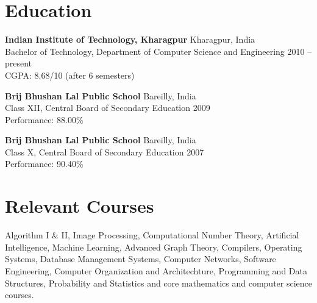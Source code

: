 \documentclass[hidelinks,margin,line,10pt,a4paper]{resume}
\begin{document}
\begin{resume}

\section{\mysidestyle Education}
\begin{list2}

            \item \textbf{Indian Institute of Technology, Kharagpur} \hfill Kharagpur, India \vspace{0mm}\\\vspace{1mm}%
    		Bachelor of Technology, Department of Computer Science and Engineering \hfill 2010 -- present  \vspace{-1mm}\\\vspace{1mm}%
		CGPA: 8.68/10 {(after 6 semesters)}
		 
             \item \textbf{Brij Bhushan Lal Public School} \hfill Bareilly, India \vspace{0mm}\\\vspace{1mm}%
    		{Class XII, Central Board of Secondary Education } \hfill { 2009}  \vspace{-1mm}\\\vspace{1mm}%
		{Performance: 88.00\%}
		
			\item \textbf{Brij Bhushan Lal Public School} \hfill Bareilly, India \vspace{0mm}\\\vspace{1mm}%
    		{Class X, Central Board of Secondary Education } \hfill { 2007 }  \vspace{-1mm}\\\vspace{1mm}%
		{Performance: 90.40\%}
% 


\end{list2}

    \section{\mysidestyle Relevant Courses} 
Algorithm I \& II, Image Processing, Computational Number Theory, Artificial Intelligence, Machine Learning, Advanced Graph Theory, Compilers, Operating Systems, Database Management Systems, Computer Networks, Software Engineering, Computer Organization and Architechture, Programming and Data Structures, Probability and Statistics and core mathematics and computer science courses.


\end{resume}
\end{document}

